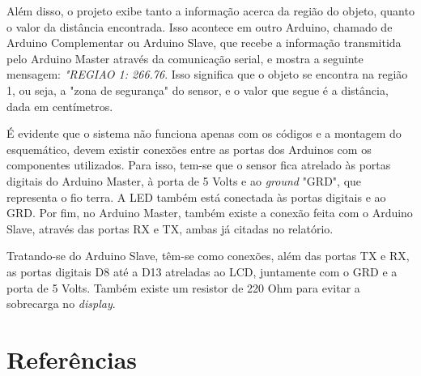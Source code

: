 \documentclass[conference]{IEEEtran}
\begin{document}
    Além disso, o projeto exibe tanto a informação acerca da região do objeto, quanto o valor da distância
encontrada. Isso acontece em outro Arduino, chamado de Arduino Complementar ou Arduino Slave, que recebe
a informação transmitida pelo Arduino Master através da comunicação serial, e mostra a seguinte mensagem:
\emph{"REGIAO 1: 266.76}. Isso significa que o objeto se encontra na região 1, ou seja, a "zona de segurança"
do sensor, e o valor que segue é a distância, dada em centímetros.

    É evidente que o sistema não funciona apenas com os códigos e a montagem do esquemático, devem existir
conexões entre as portas dos Arduinos com os componentes utilizados. Para isso, tem-se que o sensor fica 
atrelado às portas digitais do Arduino Master, à porta de 5 Volts e ao \emph{ground} "GRD", que representa
o fio terra. A LED também está conectada às portas digitais e ao GRD. Por fim, no Arduino Master, também
existe a conexão feita com o Arduino Slave, através das portas RX e TX, ambas já citadas no relatório.

    Tratando-se do Arduino Slave, têm-se como conexões, além das portas TX e RX, as portas digitais D8 até
a D13 atreladas ao LCD, juntamente com o GRD e a porta de 5 Volts. Também existe um resistor de 220 Ohm para
evitar a sobrecarga no \emph{display}.

\section{Referências}
\end{document}
